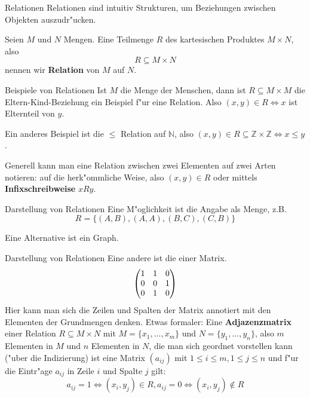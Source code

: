 \documentclass{beamer}
\begin{document}
\begin{frame}{Relationen}
 Relationen sind intuitiv Strukturen, um Beziehungen zwischen Objekten auszudr"ucken.
 \begin{definition}[Relationen]
  Seien $M$ und $N$ Mengen. Eine Teilmenge $R$ des kartesischen Produktes $M\times N$, also 
  \[R\subseteq M\times N\] nennen wir \textbf{Relation} von $M$ auf $N$.
 \end{definition}
\end{frame}

\begin{frame}{Beispiele von Relationen}  
Ist $M$ die Menge der Menschen, dann ist $R\subseteq M\times M$ die Eltern-Kind-Beziehung ein Beispiel f"ur eine Relation.
Also $(x,y)\in R\Leftrightarrow x$ ist Elternteil von $y$. 

Ein anderes Beispiel ist die $\leq$ Relation auf $\mathbb{N}$, also $(x,y)\in R\subseteq \mathbb{Z}\times\mathbb{Z}\Leftrightarrow x\leq y$.

Generell kann man eine Relation zwischen zwei Elementen auf zwei Arten notieren: auf die herk"ommliche Weise, also $(x,y)\in R$ oder mittels \textbf{Infixschreibweise} $xRy$.
\end{frame}
  

\begin{frame}{Darstellung von Relationen}
  Eine M"oglichkeit ist die Angabe als Menge, z.B. 
  \[R=\{(A,B), (A,A), (B,C), (C,B)\}\]

  Eine Alternative ist ein Graph.




\end{frame}
\begin{frame}{Darstellung von Relationen}
  Eine andere ist die einer Matrix.
  \[
  \begin{pmatrix}
    $1$ & $1$ & $0$ \\
    $0$ & $0$ & $1$ \\
    $0$ & $1$ & $0$
  \end{pmatrix}
  \]
  Hier kann man sich die Zeilen und Spalten der Matrix annotiert mit den Elementen der Grundmengen denken.
  Etwas formaler: Eine \textbf{Adjazenzmatrix} einer Relation $R\subseteq M\times N$ mit $M=\{x_1,...,x_m\}$ und $N=\{y_1,...,y_n\}$, also $m$ Elementen in $M$ und $n$ Elementen in $N$, die man sich geordnet vorstellen kann ("uber die Indizierung) ist eine Matrix $(a_{ij})$ mit $1\leq i\leq m, 1\leq j\leq n$ und f"ur die Eintr"age $a_{ij}$ in Zeile $i$ und Spalte $j$ gilt:
  \[a_{ij}=1\Leftrightarrow (x_i,y_j)\in R, a_{ij}=0\Leftrightarrow (x_i,y_j)\notin R \]
\end{frame}
\end{document}
